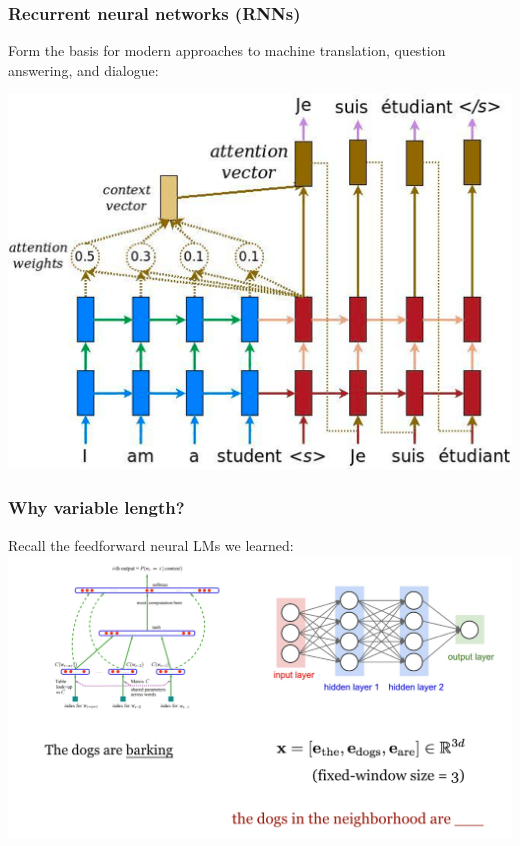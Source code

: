 \begin{frame}
\frametitle{Recurrent neural networks (RNNs)}
Form the basis for modern approaches to machine translation, question answering, and dialogue:

\centering
\includegraphics[scale=0.4]{figures/nlm/mt.png}
\end{frame}

\begin{frame}
\frametitle{Why variable length?}
Recall the feedforward neural LMs we learned:
\centering
\includegraphics[scale=0.25]{figures/nlm/fnlm.png}
\end{frame}

